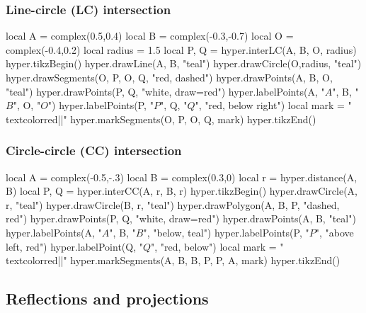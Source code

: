 \documentclass{article}
\begin{document}
\subsubsection{Line-circle (LC) intersection}
\begin{codeandresult}
\begin{luacode*}
local A = complex(0.5,0.4)
local B = complex(-0.3,-0.7)
local O = complex(-0.4,0.2)
local radius = 1.5
local P, Q = hyper.interLC(A, B, O, radius)
hyper.tikzBegin()
hyper.drawLine(A, B, "teal")
hyper.drawCircle(O,radius, "teal")
hyper.drawSegments(O, P, O, Q, "red, dashed")
hyper.drawPoints(A, B, O, "teal")
hyper.drawPoints(P, Q, "white, draw=red")
hyper.labelPoints(A, "$A$", B, "$B$", O, "$O$")
hyper.labelPoints(P, "$P$", Q, "$Q$", "red, below right")
local mark = "\\textcolor{red}{||}"
hyper.markSegments(O, P, O, Q, mark)
hyper.tikzEnd()
\end{luacode*}
\end{codeandresult}

\subsubsection{Circle-circle (CC) intersection}
\begin{codeandresult}
\begin{luacode*}
local A = complex(-0.5,-.3)
local B = complex(0.3,0)
local r = hyper.distance(A, B)
local P, Q = hyper.interCC(A, r, B, r)
hyper.tikzBegin()
hyper.drawCircle(A, r, "teal")
hyper.drawCircle(B, r, "teal")
hyper.drawPolygon(A, B, P, "dashed, red")
hyper.drawPoints(P, Q, "white, draw=red")
hyper.drawPoints(A, B, "teal")
hyper.labelPoints(A, "$A$", B, "$B$", "below, teal")
hyper.labelPoints(P, "$P$", "above left, red")
hyper.labelPoint(Q, "$Q$", "red, below")
local mark = "\\textcolor{red}{||}"
hyper.markSegments(A, B, B, P, P, A, mark)
hyper.tikzEnd()
\end{luacode*}
\end{codeandresult}



\subsection{Reflections and projections}
\end{document}
